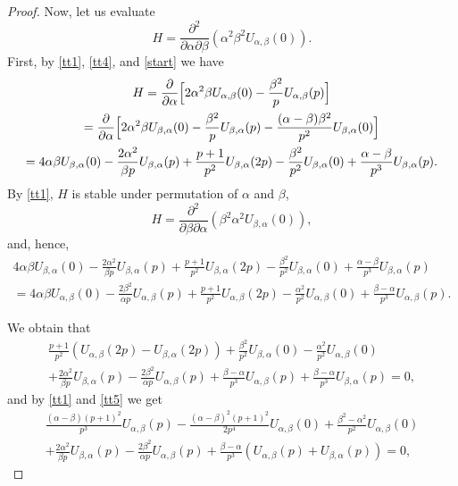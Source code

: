 \documentclass[10pt,a4paper]{amsart}
\begin{document}
\begin{proof}
Now, let us evaluate 
$$
H=\frac{\partial^2}{\partial \alpha\partial \beta}(\alpha^2\beta^2 U_{\alpha,\beta}(0)).
$$
First, by \eqref{tt1}, \eqref{tt4}, and \eqref{start} we have
\begin{multline}
H=\frac{\partial}{\partial \alpha}\Bigl[ 2\alpha^2\beta U_{\alpha,\beta}(0) -\frac{\beta^2}p U_{\alpha,\beta}(p)\Bigr]\\=
\frac{\partial}{\partial \alpha}\Bigl[ 2\alpha^2\beta U_{\beta,\alpha}(0) -\frac{\beta^2}p U_{\beta,\alpha}(p)-\frac{(\alpha-\beta)\beta^2}{p^2}U_{\beta,\alpha}(0)\Bigr]\\=
4\alpha\beta U_{\beta,\alpha}(0)-\frac{2\alpha^2}{\beta p}U_{\beta,\alpha}(p)+\frac{p+1}{p^2} U_{\beta,\alpha}(2p)-\frac{\beta^2}{p^2}U_{\beta,\alpha}(0)+\frac{\alpha-\beta}{p^3}U_{\beta,\alpha}(p)\label{tttdif}.
\end{multline}
By \eqref{tt1}, $H$ is stable under permutation of $\alpha$ and $\beta$, 
$$
H=\frac{\partial^2}{\partial \beta\partial \alpha}(\beta^2\alpha^2 U_{\beta,\alpha}(0)),
$$
and, hence,
\begin{multline*}
4\alpha\beta U_{\beta,\alpha}(0)-\frac{2\alpha^2}{\beta p}U_{\beta,\alpha}(p)+\frac{p+1}{p^2} U_{\beta,\alpha}(2p)-\frac{\beta^2}{p^2}U_{\beta,\alpha}(0)+\frac{\alpha-\beta}{p^3}U_{\beta,\alpha}(p)\\=
4\alpha\beta U_{\alpha,\beta}(0)-\frac{2\beta^2}{\alpha p}U_{\alpha,\beta}(p)+\frac{p+1}{p^2} U_{\alpha,\beta}(2p)-\frac{\alpha^2}{p^2}U_{\alpha,\beta}(0)+\frac{\beta-\alpha}{p^3}U_{\alpha,\beta}(p).
\end{multline*}

We obtain that
\begin{multline*}
\frac{p+1}{p^2} (U_{\alpha,\beta}(2p)-U_{\beta,\alpha}(2p))+ \frac{\beta^2}{p^2}U_{\beta,\alpha}(0)-\frac{\alpha^2}{p^2}U_{\alpha,\beta}(0)\\
+\frac{2\alpha^2}{\beta p}U_{\beta,\alpha}(p)-\frac{2\beta^2}{\alpha p}U_{\alpha,\beta}(p)
+\frac{\beta-\alpha}{p^3}U_{\alpha,\beta}(p)
+\frac{\beta-\alpha}{p^3}U_{\beta,\alpha}(p)=0,
\end{multline*}
and by \eqref{tt1} and \eqref{tt5} we get
\begin{multline*}
\frac{(\alpha-\beta)(p+1)^2}{p^3} U_{\alpha,\beta}(p)-\frac{(\alpha-\beta)^2(p+1)^2}{2p^4}U_{\alpha,\beta}(0)+ \frac{\beta^2-\alpha^2}{p^2}U_{\alpha,\beta}(0)\\
+\frac{2\alpha^2}{\beta p}U_{\beta,\alpha}(p)-\frac{2\beta^2}{\alpha p}U_{\alpha,\beta}(p)
+\frac{\beta-\alpha}{p^3}(U_{\alpha,\beta}(p)
+U_{\beta,\alpha}(p))=0,
\end{multline*}


\end{proof}
\end{document}
